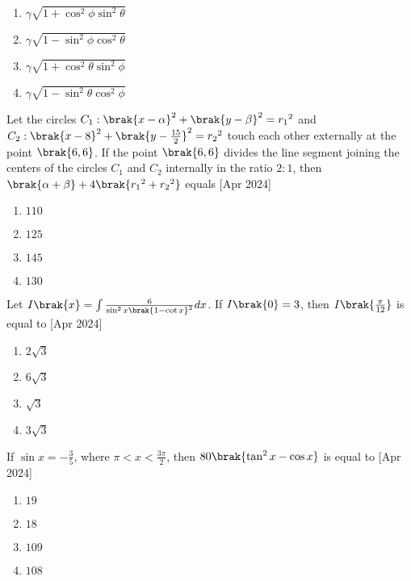		\begin{enumerate}
			\item $\gamma\sqrt{1+\cos^2{\phi}\sin^2{\theta}}$\\
			\item $\gamma\sqrt{1-\sin^2{\phi}\cos^2{\theta}}$\\
			\item $\gamma\sqrt{1+\cos^2{\theta}\sin^2{\phi}}$\\
			\item $\gamma\sqrt{1-\sin^2{\theta}\cos^2{\phi}}$\\
		\end{enumerate}
	\item Let the circles $C_1:{\brak{x-\alpha}}^2+{\brak{y-\beta}}^2={r_1}^2$ and $C_2:{\brak{x-8}}^2+{\brak{y-\frac{15}{2}}}^2={r_2}^2$ touch each other externally at the point $\brak{6,6}$. If the point $\brak{6,6}$ divides the line segment joining the centers of the circles $C_1$ and $C_2$ internally in the ratio $2:1$, then $\brak{\alpha+\beta}+4\brak{{r_1}^2+{r_2}^2}$ equals  \hfill{[Apr 2024]}
		\begin{enumerate}
			\item $110$\\
			\item $125$\\
			\item $145$\\
			\item $130$\\
		\end{enumerate}
	\item Let $I\brak{x}=\int\frac{6}{\sin^2{x}{\brak{1-\cot{x}}}^2}dx$. If $I\brak{0}=3$, then $I\brak{\frac{\pi}{12}}$ is equal to  \hfill{[Apr 2024]}
		\begin{enumerate}
			\item $2\sqrt{3}$\\
			\item $6\sqrt{3}$\\
			\item $\sqrt{3}$\\
			\item $3\sqrt{3}$\\
		\end{enumerate}
	\item If $\sin{x}=-\frac{3}{5}$, where $\pi<x<\frac{3\pi}{2}$, then $80\brak{\tan^2{x}-\cos{x}}$ is equal to  \hfill{[Apr 2024]}
		\begin{enumerate}
			\item $19$\\
			\item $18$\\
			\item $109$\\
			\item $108$\\
		\end{enumerate}
